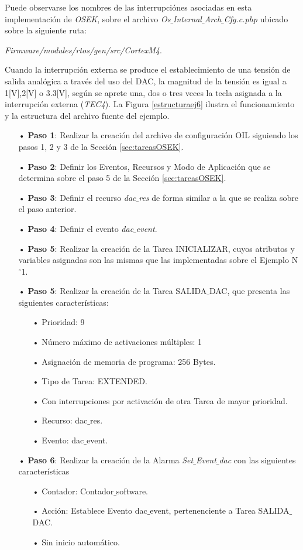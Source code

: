 \documentclass[12pt,letterpaper]{article}
\begin{document}
Puede observarse los nombres de las interrupciónes asociadas en esta implementación de \textit{OSEK}, sobre el archivo \textit{Os$\_$Internal$\_$Arch$\_$Cfg.c.php} ubicado sobre la siguiente ruta:

\textit{Firmware/modules/rtos/gen/src/CortexM4}.

Cuando la interrupción externa se produce el establecimiento de una tensión de salida analógica a través del uso del DAC, la magnitud de la tensión es igual a 1[V],2[V] o 3.3[V], según se aprete una, dos o tres veces la tecla asignada a la interrupción externa (\textit{TEC4}). La Figura \ref{estructuraej6} ilustra el funcionamiento y la estructura del archivo fuente del ejemplo.

\begin{enumerate}
\item[•]\textbf{Paso 1}: Realizar la creación del archivo de configuración OIL siguiendo los pasos 1, 2 y 3 de la Sección \ref{sec:tareasOSEK}.
\item[•]\textbf{Paso 2}: Definir los Eventos, Recursos y Modo de Aplicación que se determina sobre el paso 5 de la Sección \ref{sec:tareasOSEK}.
\item[•]\textbf{Paso 3}: Definir el recurso \textit{dac$\_$res} de forma similar a la que se realiza sobre el paso anterior.
\item[•]\textbf{Paso 4}: Definir el evento \textit{dac$\_$event}.
\item[•]\textbf{Paso 5}: Realizar la creación de la Tarea INICIALIZAR, cuyos atributos y variables asignadas son las mismas que las implementadas sobre el Ejemplo N$^{\circ}$1.

\item[•]\textbf{Paso 5}: Realizar la creación de la Tarea SALIDA$\_$DAC, que presenta las siguientes características:
\begin{enumerate}
\item[•]Prioridad: 9
\item[•]Número máximo de activaciones múltiples: 1
\item[•]Asignación de memoria de programa: 256 Bytes.
\item[•]Tipo de Tarea: EXTENDED.
\item[•]Con interrupciones por activación de otra Tarea de mayor prioridad.
\item[•]Recurso: dac$\_$res.
\item[•]Evento: dac$\_$event.
\end{enumerate}

\item[•]\textbf{Paso 6}: Realizar la creación de la Alarma \textit{Set$\_$Event$\_$dac} con las siguientes características
\begin{enumerate}
\item[•]Contador: Contador$\_$software.
\item[•]Acción: Establece Evento dac$\_$event, pertenenciente a Tarea SALIDA$\_$DAC.
\item[•]Sin inicio automático.
\end{enumerate}


\end{enumerate}
\end{document}
